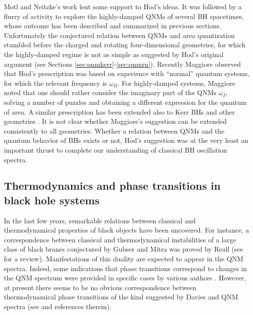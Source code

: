 \documentclass[]{iopart}
\begin{document}
Motl and Neitzke's work lent some support to Hod's ideas. It was followed by a
flurry of activity to explore the highly-damped QNMs of several BH spacetimes,
whose outcome has been described and summarized in previous
sections. Unfortunately the conjectured relation between QNMs and area
quantization stumbled before the charged and rotating four-dimensional
geometries, for which the highly-damped regime is not as simple as suggested
by Hod's original argument (see Sections \ref{sec:qnmkerr}-\ref{sec:qnmrn}).
Recently Maggiore \cite{Maggiore:2007nq} observed that Hod's prescription was
based on experience with ``normal'' quantum systems, for which the relevant
frequency is $\omega_R$. For highly-damped systems, Maggiore noted that one
should rather consider the imaginary part of the QNMs $\omega_I$, solving a
number of puzzles and obtaining a different expression for the quantum of
area. A similar prescription has been extended also to Kerr BHs
\cite{Vagenas:2008yi,Medved:2008iq} and other geometries \cite{Wei:2009yj}.
It is not clear whether Maggiore's suggestion can be extended consistently to
all geometries. Whether a relation between QNMs and the quantum behavior of
BHs exists or not, Hod's suggestion was at the very least an important thrust
to complete our understanding of classical BH oscillation spectra.

\subsection{Thermodynamics and phase transitions in black hole systems}

In the last few years, remarkable relations between classical and
thermodynamical properties of black objects have been uncovered. For instance,
a correspondence between classical and thermodynamical instabilities of a
large class of black branes conjectured by Gubser and Mitra
\cite{Gubser:2000ec,Gubser:2000mm} was proved by Reall \cite{Reall:2001ag}
(see \cite{Harmark:2007md} for a review). Manifestations of this duality are
expected to appear in the QNM spectra. Indeed, some indications that phase
transitions correspond to changes in the QNM spectrum were provided in
specific cases by various authors
\cite{Koutsoumbas:2006xj,Shen:2007xk,Rao:2007zzb,
  Myung:2008ze,Koutsoumbas:2008pw,Koutsoumbas:2008yq}. However, at present
there seems to be no obvious correspondence between thermodynamical phase
transitions of the kind suggested by Davies \cite{Davies:1978mf,Davies:1989ey}
and QNM spectra (see \cite{Berti:2008xu} and references therein).
\end{document}
